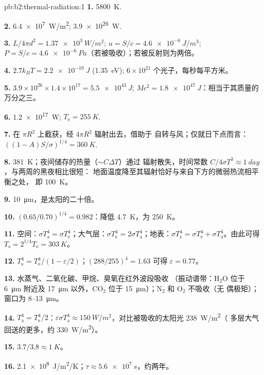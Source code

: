 \begin{solution}{pb:b2:thermal-radiation:1}
\textbf{1.} \qty{5800}{K}.

\textbf{2.} \qty{6.4e7}{W/m^2}; \qty{3.9e26}{W}.

\textbf{3.} $L/4\pi d^2 = \qty{1.37e3}{W/m^2}$; $u = S/c = \qty{4.6e-6}{J/m^3}$;
$P = S/c = \qty{4.6e-6}{Pa}$（若被吸收）；若被反射则为两倍。

\textbf{4.} $2.7k_BT = \qty{2.2e-19}{J}$ (\qty{1.35}{eV}); $6 \times 10^{21}$
个光子，每秒每平方米。

\textbf{5.} $3.9 \times 10^{26} \times 1.4 \times 10^{17} = \qty{5.5e43}{J}$; $Mc^2 =
\qty{1.8e47}{J}$：相当于其质量的万分之三。

\textbf{6.} \qty{1.2e17}{W}; $T_{\text{e}} = \qty{255}{K}$.

\textbf{7.} 在 $\pi R^2$ 上截获，经 $4\pi R^2$ 辐射出去，借助于
自转与风；仅就日下点而言：$((1 - A)S/\sigma)^{1/4} =
\qty{360}{K}$.

\textbf{8.} \qty{381}{K}；夜间储存的热量（$\sim C\Delta T$）通过
辐射散失，时间常数 $C/4\sigma T^3 \approx \qty{1}{day}$，与两周的黑夜相比很短：
地面温度降至其辐射恰好与来自下方的微弱热流相平衡之处，
即 \qty{100}{K}。

\textbf{9.} \qty{10}{\micro m}，是太阳的二十倍。

\textbf{10.} $(0.65/0.70)^{1/4} = 0.982$：降低 \qty{4.7}{K}，为 \qty{250}{K}。

\textbf{11.} 空间：$\sigma T_{\text{a}}^4 = \sigma T_{\text{e}}^4$；大气层：$\sigma
T_{\text{s}}^4 = 2\sigma T_{\text{a}}^4$；地表：$\sigma T_{\text{s}}^4 = \sigma
T_{\text{e}}^4 + \sigma T_{\text{a}}^4$。由此可得 $T_{\text{s}} = 2^{1/4}T_{\text{e}} = \qty{303}{K}$。

\textbf{12.} $T_{\text{s}}^4 = T_{\text{e}}^4/(1 - \varepsilon/2)$；$(288/255)^4 = 1.63$
可得 $\varepsilon = 0.77$。

\textbf{13.} 水蒸气、二氧化碳、甲烷、臭氧在红外波段吸收
（振动谱带：H$_2$O 位于 \qty{6}{\micro m} 附近及
\qty{17}{\micro m} 以外，CO$_2$ 位于 \qty{15}{\micro m}）；N$_2$ 和 O$_2$ 不吸收（无
偶极矩）；窗口为 \qty{8}{}--\qty{13}{\micro m}。

\textbf{14.} $T_{\text{a}}^4 = T_{\text{s}}^4/2$：$\varepsilon\sigma T_{\text{a}}^4 \approx
\qty{150}{W/m^2}$，对比被吸收的太阳光 \qty{238}{W/m^2}（
多层大气回送的更多，约 \qty{330}{W/m^2}）。

\textbf{15.} $3.7/3.8 \approx \qty{1}{K}$。

\textbf{16.} \qty{2.1e8}{J/m^2/K}；$\tau \approx \qty{5.6e7}{s}$，约两年。


\end{solution}
